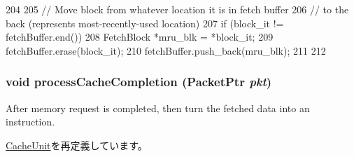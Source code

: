 \begin{DoxyCode}
204 {
205     // Move block from whatever location it is in fetch buffer
206     // to the back (represents most-recently-used location)
207     if (block_it != fetchBuffer.end()) {
208         FetchBlock *mru_blk = *block_it;
209         fetchBuffer.erase(block_it);
210         fetchBuffer.push_back(mru_blk);
211     }
212 }
\end{DoxyCode}
\hypertarget{classFetchUnit_a3dc029c2e87eb911352b82ff15c86236}{
\subsubsection[{processCacheCompletion}]{\setlength{\rightskip}{0pt plus 5cm}void processCacheCompletion ({\bf PacketPtr} {\em pkt})}}
\label{classFetchUnit_a3dc029c2e87eb911352b82ff15c86236}
After memory request is completed, then turn the fetched data into an instruction. 

\hyperlink{classCacheUnit_a3dc029c2e87eb911352b82ff15c86236}{CacheUnit}を再定義しています。


